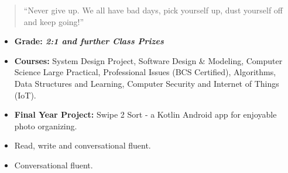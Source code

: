 \begin{quote}
``Never give up. We all have bad days, pick yourself up, dust yourself off and keep going!''
\end{quote}

\smallskip
\smallskip
\smallskip
\smallskip

\begin{itemize}
\item \textbf{Grade: \textit{2:1 and further Class Prizes}}
\item \textbf{Courses:} System Design Project, Software Design \& Modeling, Computer Science Large Practical, Professional Issues (BCS Certified), Algorithms, Data Structures and Learning, Computer Security and Internet of Things (IoT).
\item \textbf{Final Year Project:} Swipe 2 Sort - a Kotlin Android app for enjoyable photo organizing.
\end{itemize}
\divider


{}
{}
{}
{}
{}
{}
{}
{}
{}
{}
{}
\smallskip
\smallskip




\begin{itemize}
\item Read, write and conversational fluent.
\smallskip
\smallskip
\end{itemize}

\begin{itemize}
\item Conversational fluent.
\end{itemize}


